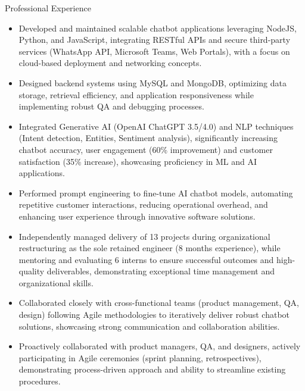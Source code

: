 \documentclass{resume}
\begin{document}
\begin{experienceSection}{Professional Experience}
    \experienceItem[
        company={Yellow.Ai},
        location={Bengaluru, IN},
        position={Software Engineer},
        duration={Sep 2021 – Jul 2023}
    ]
    \begin{itemize}
    \itemsep -6pt {}
    \item Developed and maintained scalable chatbot applications leveraging NodeJS, Python, and JavaScript, integrating RESTful APIs and secure third-party services (WhatsApp API, Microsoft Teams, Web Portals), with a focus on cloud-based deployment and networking concepts.
    \item Designed backend systems using MySQL and MongoDB, optimizing data storage, retrieval efficiency, and application responsiveness while implementing robust QA and debugging processes.
    \item Integrated Generative AI (OpenAI ChatGPT 3.5/4.0) and NLP techniques (Intent detection, Entities, Sentiment analysis), significantly increasing chatbot accuracy, user engagement (60\% improvement) and customer satisfaction (35\% increase), showcasing proficiency in ML and AI applications.
    \item Performed prompt engineering to fine-tune AI chatbot models, automating repetitive customer interactions, reducing operational overhead, and enhancing user experience through innovative software solutions.
    \item Independently managed delivery of 13 projects during organizational restructuring as the sole retained engineer (8 months experience), while mentoring and evaluating 6 interns to ensure successful outcomes and high-quality deliverables, demonstrating exceptional time management and organizational skills.
    \item Collaborated closely with cross-functional teams (product management, QA, design) following Agile methodologies to iteratively deliver robust chatbot solutions, showcasing strong communication and collaboration abilities.
    \item Proactively collaborated with product managers, QA, and designers, actively participating in Agile ceremonies (sprint planning, retrospectives), demonstrating process-driven approach and ability to streamline existing procedures.
    \end{itemize}


\end{experienceSection}
\end{document}
